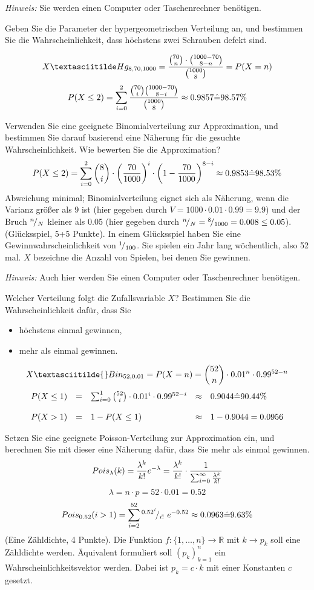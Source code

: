 \documentclass[twoside]{article}
\begin{document}
	\textit{Hinweis:} Sie werden einen Computer oder Taschenrechner benötigen.

	\sss
	Geben Sie die Parameter der hypergeometrischen Verteilung an, und bestimmen Sie die Wahrscheinlichkeit, dass höchstens zwei Schrauben defekt sind.
	
	\[
		X \textasciitilde Hg_{8,70,1000} = \frac{\binom{70}{n} \cdot \binom{1000-70}{8-n}}{\binom{1000}{8}} = P(X=n)
	\]
	\[
		P(X \leq 2) = \sum_{i= 0}^{2} \frac{\binom{70}{i} \binom{1000-70}{8-i}}{\binom{1000}{8}}\approx 0.9857 \hat{=} 98.57\%
	\]
	
	\sss
	Verwenden Sie eine geeignete Binomialverteilung zur Approximation, und bestimmen Sie darauf basierend eine Näherung für die gesuchte Wahrscheinlichkeit.
	Wie bewerten Sie die Approximation?
	\[
		P(X\leq 2) = \sum_{i= 0}^{2}\binom{8}{i}\cdot\left(\frac{70}{1000}\right)^i\cdot\left(1-\frac{70}{1000}\right)^{8-i} \approx 0.9853 \hat{=} 98.53\%
	\]
	Abweichung minimal; Binomialverteilung eignet sich als Näherung, wenn die Varianz größer als 9 ist (hier gegeben durch $V=1000\cdot0.01\cdot0.99=9.9$) und der Bruch ${}^{n}\!/_{N}$ kleiner als 0.05 (hier gegeben durch ${}^{n}\!/_{N}={}^{8}\!/_{1000}=0.008 \leq 0.05$).
	(Glücksspiel, 5+5 Punkte).
	In einem Glücksspiel haben Sie eine Gewinnwahrscheinlichkeit von ${}^{1}\!/_{100}$.
	Sie spielen ein Jahr lang wöchentlich, also 52 mal.
	$X$ bezeichne die Anzahl von Spielen, bei denen Sie gewinnen.
	
	\textit{Hinweis:} Auch hier werden Sie einen Computer oder Taschenrechner benötigen.
	
	\sss
	Welcher Verteilung folgt die Zufallsvariable $X$?
	Bestimmen Sie die Wahrscheinlichkeit dafür, dass Sie
	\begin{itemize}
		\item höchstens einmal gewinnen,
		\item mehr als einmal gewinnen.
	\end{itemize}
	\[
		X \textasciitilde{} Bin_{52,0.01} = P(X=n)=\binom{52}{n}\cdot 0.01^n \cdot 0.99^{52-n}
	\]
	\[
		\begin{array}{lllll}
			P(X\leq 1)&=&\sum_{i= 0}^{1}\binom{52}{i} \cdot 0.01^i \cdot 0.99^{52-i} &\approx& 0.9044 \hat{=} 90.44\%\\
			\\
			P(X > 1) &=& 1-P(X\leq 1) &\approx& 1-0.9044=0.0956 
		\end{array}
	\]
	
	\sss
	Setzen Sie eine geeignete Poisson-Verteilung zur Approximation ein, und berechnen Sie mit dieser eine Näherung dafür, dass Sie mehr als einmal gewinnen.
	\[
		Pois_{\lambda}(k)=\frac{\lambda^k}{k!}e^{-\lambda}=\frac{\lambda^k}{k!} \cdot \frac{1}{\sum_{i= 0}^{\infty}\frac{\lambda^k}{k!}}
	\]
	\[
		\lambda=n \cdot p=52\cdot0.01=0.52
	\]
	\[
		Pois_{0.52}(i>1)=\sum_{i= 2}^{52}{}^{0.52^i}\!/_{i!}~e^{-0.52}\approx0.0963 \hat{=} 9.63\%
	\]
	(Eine Zähldichte, 4 Punkte).
	Die Funktion $f:\{1,\dots,n\} \rightarrow \mathbb{R}$ mit $k \rightarrow p_k$ soll eine Zähldichte werden.
	Äquivalent formuliert soll $(p_k)_{k=1}^{n}$ ein Wahrscheinlichkeitsvektor werden.
	Dabei ist $p_k=c \cdot k$ mit einer Konstanten $c$ gesetzt.
	
\end{document}
